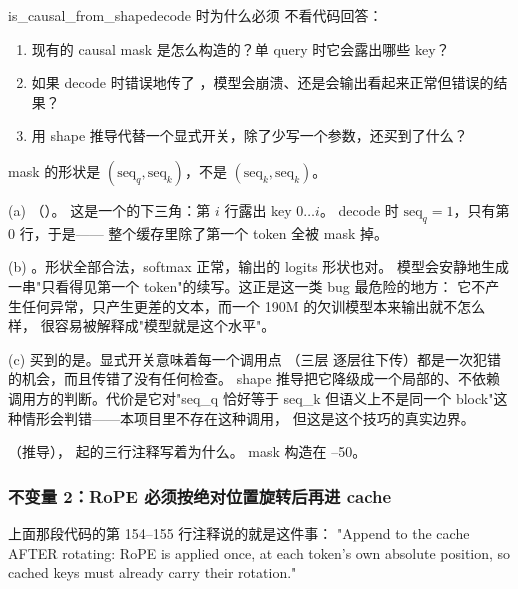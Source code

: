 \begin{checkpoint}{is_causal_from_shape}{decode 时为什么必须 }
不看代码回答：
\begin{enumerate}[label=(\alph*)]
  \item 现有的 causal mask 是怎么构造的？单 query 时它会露出哪些 key？
  \item 如果 decode 时错误地传了 ，模型会崩溃、还是会输出看起来正常但错误的结果？
  \item 用 shape 推导代替一个显式开关，除了少写一个参数，还买到了什么？
\end{enumerate}
\hint mask 的形状是 $(\text{seq}_q, \text{seq}_k)$，不是 $(\text{seq}_k, \text{seq}_k)$。

\ifshowanswers
\tcblower
\answer (a) 
（）。
这是一个的下三角：第 $i$ 行露出 key $0 \ldots i$。
decode 时 $\text{seq}_q = 1$，只有第 0 行，于是——
整个缓存里除了第一个 token 全被 mask 掉。

(b) 。形状全部合法，softmax 正常，输出的 logits 形状也对。
模型会安静地生成一串"只看得见第一个 token"的续写。这正是这一类 bug 最危险的地方：
它不产生任何异常，只产生更差的文本，而一个 190M 的欠训模型本来输出就不怎么样，
很容易被解释成"模型就是这个水平"。

(c) 买到的是。显式开关意味着每一个调用点
（三层  逐层往下传）都是一次犯错的机会，而且传错了没有任何检查。
shape 推导把它降级成一个局部的、不依赖调用方的判断。代价是它对"seq\_q 恰好等于 seq\_k
但语义上不是同一个 block"这种情形会判错——本项目里不存在这种调用，
但这是这个技巧的真实边界。

\whereincode {}（推导），
 起的三行注释写着为什么。
mask 构造在 --50。
\fi
\end{checkpoint}

\subsubsection{不变量 2：RoPE 必须按绝对位置旋转后再进 cache}

上面那段代码的第 154--155 行注释说的就是这件事：
"Append to the cache AFTER rotating: RoPE is applied once, at each token's own absolute
position, so cached keys must already carry their rotation."

